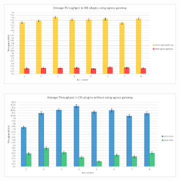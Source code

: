 \begin{figure}[H]
    \centering
    \begin{subfigure}[b]{0.45\textwidth}
        \includegraphics[width=\textwidth]{plots/egress/throughput_egress.png}
        \caption{}
        \label{fig:throughput_a}
    \end{subfigure}
    \hfill
    \begin{subfigure}[b]{0.45\textwidth}
        \includegraphics[width=\textwidth]{plots/egress/throughput_base.png}
        \caption{}
        \label{fig:throughput_b}
    \end{subfigure}
    
    \vspace{10pt}
    

\end{figure}
